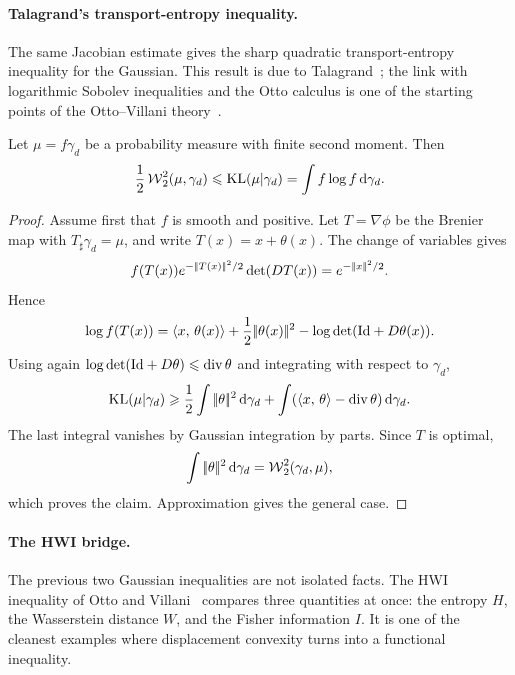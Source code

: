 \paragraph{Talagrand's transport-entropy inequality.}
The same Jacobian estimate gives the sharp quadratic transport-entropy inequality for the Gaussian. This result is due to Talagrand~\cite{Talagrand1996Transport}; the link with logarithmic Sobolev inequalities and the Otto calculus is one of the starting points of the Otto--Villani theory~\cite{OttoVillani2000Generalization,Villani09}.

\begin{prop}\label{prop-gaussian-talagrand-t2}
	Let $\mu=f\gamma_d$ be a probability measure with finite second moment. Then
	\[
		\frac12\operatorname{\mathcal{W}}_2^2(\mu,\gamma_d)
		\leqslant
		\operatorname{KL}(\mu|\gamma_d)
		=
		\int f\log f\,\mathrm{d}\gamma_d .
	\]
\end{prop}

\begin{proof}
	Assume first that $f$ is smooth and positive. Let $T=\nabla\phi$ be the Brenier map with $T_\sharp\gamma_d=\mu$, and write $T(x)=x+\theta(x)$. The change of variables gives
	\[
		f(T(x))e^{-|\!| T(x) |\!|^2/2}\det(DT(x))
		=
		e^{-|\!| x |\!|^2/2}.
	\]
	Hence
	\[
		\log f(T(x))
		=
		\langle x,\,\theta(x)\rangle
		+
		\frac12|\!| \theta(x) |\!|^2
		-
		\log\det(\mathrm{Id}+D\theta(x)).
	\]
	Using again $\log\det(\mathrm{Id}+D\theta)\leqslant\operatorname{div}\theta$ and integrating with respect to $\gamma_d$,
	\[
		\operatorname{KL}(\mu|\gamma_d)
		\geqslant
		\frac12\int|\!| \theta |\!|^2\,\mathrm{d}\gamma_d
		+
		\int(\langle x,\,\theta\rangle-\operatorname{div}\theta)\,\mathrm{d}\gamma_d.
	\]
	The last integral vanishes by Gaussian integration by parts. Since $T$ is optimal,
	\[
		\int|\!| \theta |\!|^2\,\mathrm{d}\gamma_d=\operatorname{\mathcal{W}}_2^2(\gamma_d,\mu),
	\]
	which proves the claim. Approximation gives the general case.
\end{proof}

\paragraph{The HWI bridge.}
The previous two Gaussian inequalities are not isolated facts. The HWI inequality of Otto and Villani~\cite{OttoVillani2000Generalization} compares three quantities at once: the entropy \(H\), the Wasserstein distance \(W\), and the Fisher information \(I\). It is one of the cleanest examples where displacement convexity turns into a functional inequality.

